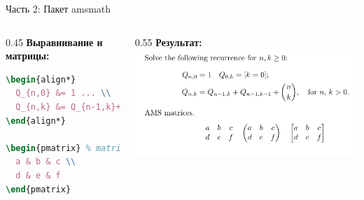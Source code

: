 \documentclass[aspectratio=169]{beamer}
\begin{document}
\begin{frame}[fragile]{Часть 2: Пакет amsmath}
    \begin{columns}[T]
        \begin{column}{0.45\textwidth}
            \textbf{Выравнивание и матрицы:}
            \begin{lstlisting}[language=tex]
\begin{align*}
  Q_{n,0} &= 1 ... \\
  Q_{n,k} &= Q_{n-1,k}+Q_{n-1,k-1}+\binom{n}{k},
\end{align*}

\begin{pmatrix} % matrix; bmatrix
  a & b & c \\
  d & e & f
\end{pmatrix}
            \end{lstlisting}
        \end{column}
        \begin{column}{0.55\textwidth}
            \textbf{Результат:}
            \includegraphics[width=\textwidth, height=0.7\textheight, keepaspectratio]{image/2.png}
        \end{column}
    \end{columns}
\end{frame}
\end{document}
